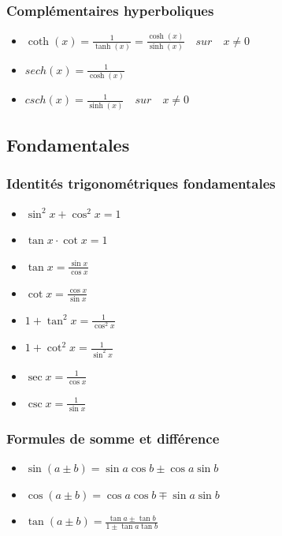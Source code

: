 \documentclass[12]{article}%
\theoremstyle{plain}
\theoremstyle{definition}
\theoremstyle{remark}
\begin{document}
\subsubsection{Complémentaires hyperboliques}
\begin{itemize}
	\item \( \boxed{\coth(x) = \frac{1}{\tanh(x)} = \frac{\cosh(x)}{\sinh(x)} } \quad sur \quad x \neq 0 \)
	\item \( \boxed{sech(x) = \frac{1}{\cosh(x)}} \)
	\item \( \boxed{csch(x) = \frac{1}{\sinh(x)}} \quad sur \quad x \neq 0 \)
\end{itemize}

\subsection{Fondamentales}
\subsubsection{Identités trigonométriques fondamentales}
\begin{itemize}
	\item \( \boxed{\sin^2 x + \cos^2 x = 1} \)
	\item \( \boxed{\tan x \cdot \cot x = 1} \)
	\item \( \boxed{\tan x = \frac{\sin x}{\cos x}} \)
	\item \( \boxed{\cot x = \frac{\cos x}{\sin x}} \)
	\item \( \boxed{1 + \tan^2 x = \frac{1}{\cos^2 x}} \)
	\item \( \boxed{1 + \cot^2 x = \frac{1}{\sin^2 x}} \)
	\item \( \boxed{\sec x = \frac{1}{\cos x}} \)
	\item \( \boxed{\csc x = \frac{1}{\sin x}} \)
\end{itemize}

\subsubsection{Formules de somme et différence}
\begin{itemize}
	\item \( \boxed{\sin(a \pm b) = \sin a \cos b \pm \cos a \sin b} \)
	\item \( \boxed{\cos(a \pm b) = \cos a \cos b \mp \sin a \sin b} \)
	\item \( \boxed{\tan(a \pm b) = \frac{\tan a \pm \tan b}{1 \pm \tan a \tan b}} \)
\end{itemize}
\end{document}
